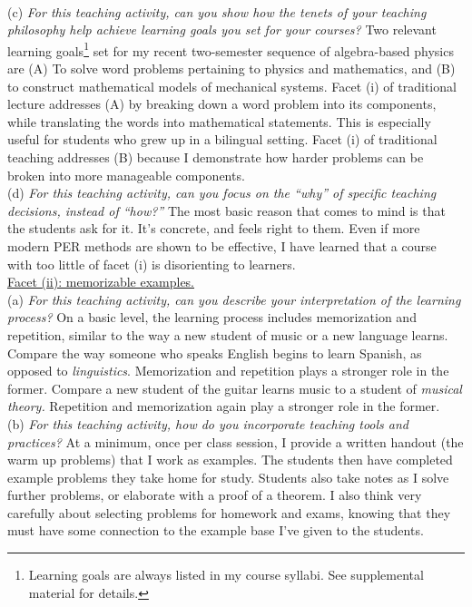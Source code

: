 \documentclass[../../../main.tex]{subfiles}
\begin{document}
\\
\vspace{0.25cm}
(c) \textit{For this teaching activity, can you show how the tenets of your teaching philosophy help achieve learning goals you set for your courses?} Two relevant learning goals\footnote{Learning goals are always listed in my course syllabi.  See supplemental material for details.} set for my recent two-semester sequence of algebra-based physics are (A) To solve word problems pertaining to physics and mathematics, and (B) to construct mathematical models of mechanical systems.  Facet (i) of traditional lecture addresses (A) by breaking down a word problem into its components, while translating the words into mathematical statements.  This is especially useful for students who grew up in a bilingual setting.  Facet (i) of traditional teaching addresses (B) because I demonstrate how harder problems can be broken into more manageable components.
\\
\vspace{0.25cm}
(d) \textit{For this teaching activity, can you focus on the ``why'' of specific teaching decisions, instead of ``how?''}  The most basic reason that comes to mind is that the students ask for it.  It's concrete, and feels right to them.  Even if more modern PER methods are shown to be effective, I have learned that a course with too little of facet (i) is disorienting to learners.
\\
\vspace{0.25cm}
\underline{Facet (ii): memorizable examples.}
\\
\vspace{0.25cm}
(a) \textit{For this teaching activity, can you describe your interpretation of the learning process?} On a basic level, the learning process includes memorization and repetition, similar to the way a new student of music or a new language learns.  Compare the way someone who speaks English begins to learn Spanish, as opposed to \textit{linguistics}.  Memorization and repetition plays a stronger role in the former.  Compare a new student of the guitar learns music to a student of \textit{musical theory.}  Repetition and memorization again play a stronger role in the former.
\\
\vspace{0.25cm}
(b) \textit{For this teaching activity, how do you incorporate teaching tools and practices?}  At a minimum, once per class session, I provide a written handout (the warm up problems) that I work as examples.  The students then have completed example problems they take home for study.  Students also take notes as I solve further problems, or elaborate with a proof of a theorem.  I also think very carefully about selecting problems for homework and exams, knowing that they must have some connection to the example base I've given to the students.
\end{document}
